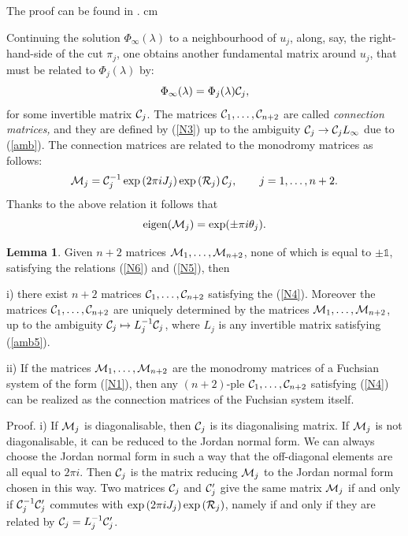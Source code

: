 \documentclass[12pt]{article}
\newcommand{\ID}{\mathbb{1}}
\theoremstyle{definition}
\theoremstyle{theorem}
\newtheorem{lm}[df]{Lemma}
\begin{document}
\noindent The proof can be found in  \cite{Dub1}.
 cm




Continuing the solution $\Phi_\infty(\lambda)$ to a neighbourhood of $u_j$, 
along, say, the right-hand-side of the cut $\pi_j$, one obtains another 
fundamental matrix around $u_j$, that must be related to $\Phi_j(\lambda)$ by:
\begin{equation}
\Phi_\infty(\lambda)=\Phi_j(\lambda){\cal C}_j,\label{N3}
\end{equation}
for some invertible matrix ${\cal C}_j$. The matrices 
${\cal C}_1,\dots,{\cal C}_{n+2}$  are called 
{\it connection matrices,}\/ and they are defined by (\ref{N3}) up to
the ambiguity ${\cal C}_j\to{\cal C}_jL_\infty$ due to (\ref{amb}).
The connection matrices are related to the monodromy matrices as 
follows:
\begin{equation}
{\cal M}_j={\cal C}_j^{-1} \exp\left(2\pi i J_j\right)
\exp\left( {\cal R}_j\right) 
{\cal C}_j,\qquad j=1,\dots,n+2.
\label{N4}
\end{equation}
Thanks to the above relation it follows that
\begin{equation}
{\rm eigen}({\cal M}_j)=\exp(\pm\pi i\theta_j).
\label{N5}
\end{equation}



\begin{lm}
Given $n+2$ matrices 
${\cal M}_1,\dots, {\cal M}_{n+2}$, none of which is equal to 
$\pm\ID$, satisfying the relations (\ref{N6}) and (\ref{N5}), then
\item{i)} there exist $n+2$ matrices ${\cal C}_1,\dots,{\cal C}_{n+2}$ 
satisfying the (\ref{N4}). Moreover the matrices 
${\cal C}_1,\dots,{\cal C}_{n+2}$ are uniquely determined by 
the matrices ${\cal M}_1,\dots,{\cal M}_{n+2}$, up to the ambiguity 
${\cal C}_j\mapsto L_j^{-1} {\cal C}_j$, where $L_j$ is any invertible
matrix satisfying (\ref{amb5}).
\item{ii)} If the matrices ${\cal M}_1,\dots,{\cal M}_{n+2}$ 
are the monodromy matrices of a Fuchsian system of the form
(\ref{N1}), then any $(n+2)$-ple ${\cal C}_1,\dots,{\cal C}_{n+2}$
satisfying (\ref{N4}) can be realized as the connection matrices of 
the Fuchsian system itself. 
\label{lm2.5}
\end{lm}

\noindent Proof. i) If ${\cal M}_j$ is diagonalisable, then ${\cal C}_j$
is its diagonalising matrix. If ${\cal M}_j$ is not diagonalisable, it
can be reduced to the Jordan normal form. We can always choose the 
Jordan normal form in such a way that the off-diagonal elements are
all equal to $2\pi i$. Then ${\cal C}_j$ is the matrix reducing 
${\cal M}_j$ to the Jordan normal form chosen in this way.
Two matrices ${\cal C}_j$ and ${\cal C}'_j$ give the same matrix 
${\cal M}_j$ if and only if ${\cal C}_j^{-1} {\cal C}'_j$ commutes
with $\exp\left(2\pi i J_j\right)\exp\left({\cal R}_j\right)$, 
namely if and only if they are related by 
${\cal C}_j = L_j^{-1} {\cal C}'_j$.
\end{document}
